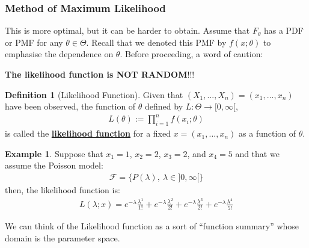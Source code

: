 \documentclass[11pt]{scrartcl}
\theoremstyle{definition}
\newtheorem{definition}{Definition}
\newtheorem{ex}{Example}
\theoremstyle{remark}
\newcommand{\dfn}[1]{\textbf{\underline{#1}}}
\newcommand{\dist}[0]{\mathcal{F}}
\begin{document}
	

\subsubsection{Method of Maximum Likelihood}
This is more optimal, but it can be harder to obtain. Assume that $F_\theta$ has a PDF or PMF for any $\theta \in \Theta$. Recall that we denoted this PMF by $f(x; \theta)$ to emphasise the dependence on $\theta$. Before proceeding, a word of caution: 

\begin{center}
	\textbf{The likelihood function is NOT RANDOM}!!! 
\end{center}

\begin{definition}[Likelihood Function]
	Given that $(X_1, ..., X_n) = (x_1, ..., x_n)$ have been observed, the function of $\theta$ defined by $L: \Theta \rightarrow [0, \infty[$,
	\begin{align}
		L(\theta) := \prod_{i=1}^n f(x_i; \theta) 
	\end{align}
	is called the \dfn{likelihood function} for a fixed $x = (x_1, ..., x_n)$ as a function of $\theta$. 
\end{definition}

\begin{ex} 
	Suppose that $x_1 = 1$, $x_2 = 2$, $x_3 = 2$, and $x_4 =5$ and that we assume the Poisson model: 
	\begin{align*}
		\dist = \{ P(\lambda),\ \lambda \in ]0, \infty[ \} 	
	\end{align*}
	then, the likelihood function is: 
	\begin{align*}
		L(\lambda; x) = e^{-\lambda} \frac{\lambda^1}{1!}	+  e^{-\lambda} \frac{\lambda^2}{2!} +  e^{-\lambda} \frac{\lambda^3}{2!} +  e^{-\lambda} \frac{\lambda^4}{5!}
	\end{align*}
\end{ex}

We can think of the Likelihood function as a sort of ``function summary'' whose domain is the parameter space. 
\end{document}
